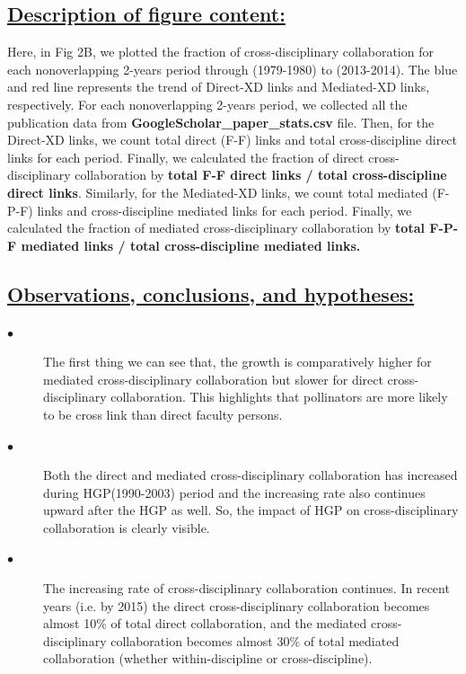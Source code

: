 \documentclass{article}\usepackage[]{graphicx}\usepackage[]{color}
\begin{document}
\subsection*{\underline{Description of figure content:}}
\par{Here, in Fig 2B, we plotted the fraction of cross-disciplinary collaboration for each nonoverlapping 2-years period through (1979-1980) to (2013-2014). The blue and red line represents the trend of Direct-XD links and Mediated-XD links, respectively. For each nonoverlapping 2-years period, we collected all the publication data from \textbf{GoogleScholar\_paper\_stats.csv} file. Then, for the Direct-XD links, we count total direct (F-F) links and total cross-discipline direct links for each period. Finally, we calculated the fraction of direct cross-disciplinary collaboration by \textbf{total F-F direct links / total cross-discipline direct links}. Similarly, for the Mediated-XD links, we count total mediated (F-P-F) links and cross-discipline mediated links for each period. Finally, we calculated the fraction of mediated cross-disciplinary collaboration by \textbf{total F-P-F mediated links / total cross-discipline mediated links.}}
\subsection*{\underline{Observations, conclusions, and hypotheses:}}
\begin{description}
  \item[$\bullet$] The first thing we can see that, the growth is comparatively higher for mediated cross-disciplinary collaboration but slower for direct cross-disciplinary collaboration. This highlights that pollinators are more likely to be cross link than direct faculty persons.
  \item[$\bullet$] Both the direct and mediated cross-disciplinary collaboration has increased during HGP(1990-2003) period and the increasing rate also continues upward after the HGP as well. So, the impact of HGP on cross-disciplinary collaboration is clearly visible.
  \item[$\bullet$] The increasing rate of cross-disciplinary collaboration continues. In recent years (i.e. by 2015) the direct cross-disciplinary collaboration becomes almost 10\% of total direct collaboration, and the mediated cross-disciplinary collaboration becomes almost 30\% of total mediated collaboration (whether within-discipline or cross-discipline).
\end{description}
\end{document}

